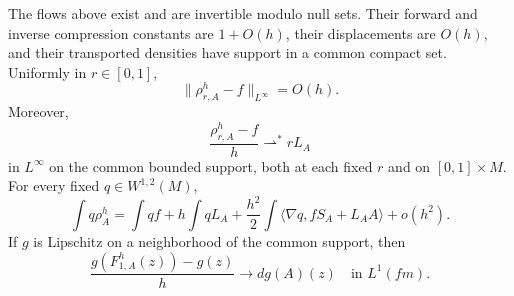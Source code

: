 \begin{lemma}
\label{fwd:flow}
The flows above exist and are invertible modulo null sets. Their
forward and inverse compression constants are \(1+O(h)\), their
displacements are \(O(h)\), and their transported densities have
support in a common compact set. Uniformly in \(r\in[0,1]\),
\begin{equation}
\label{fwd:flow-density-bound}
 \|\rho^h_{r,A}-f\|_{L^\infty}=O(h).
\end{equation}
Moreover,
\begin{equation}
\label{fwd:flow-first}
 \frac{\rho^h_{r,A}-f}{h}\rightharpoonup^* rL_A
\end{equation}
in \(L^\infty\) on the common bounded support, both at each fixed
\(r\) and on \([0,1]\times M\). For every fixed
\(q\in W^{1,2}(M)\),
\begin{equation}
\label{fwd:flow-second}
 \int q\rho^h_A
 =\int qf+h\int qL_A
 +\frac{h^2}{2}\int
   \langle\nabla q,fS_A+L_AA\rangle+o(h^2).
\end{equation}
If \(g\) is Lipschitz on a neighborhood of the common support, then
\begin{equation}
\label{fwd:increment}
 \frac{g(F^h_{1,A}(z))-g(z)}{h}
 \longrightarrow dg(A)(z)
 \quad\text{in }L^1(fm).
\end{equation}
\end{lemma}

